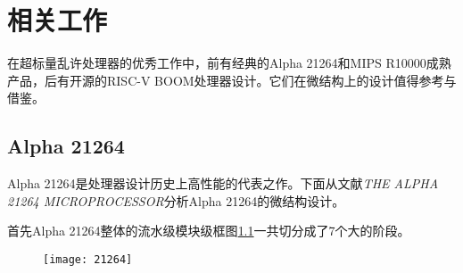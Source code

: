 \chapter{相关工作}\label{sec:meterial}
在超标量乱许处理器的优秀工作中，前有经典的Alpha 21264和MIPS R10000成熟产品，后有开源的RISC-V BOOM处理器设计。它们在微结构上的设计值得参考与借鉴。
\section{Alpha 21264}\label{subsec:alpha}

Alpha 21264是处理器设计历史上高性能的代表之作。下面从文献\textit{THE ALPHA 21264 MICROPROCESSOR}\citep{Alpha21264}分析Alpha 21264的微结构设计。

首先Alpha 21264整体的流水级模块级框图\ref{fig:alpha_stage}一共切分成了7个大的阶段。
\begin{figure}[!htbp]
	\centering
	\texttt{[image: 21264]}
	\label{fig:alpha_stage}
\end{figure}

